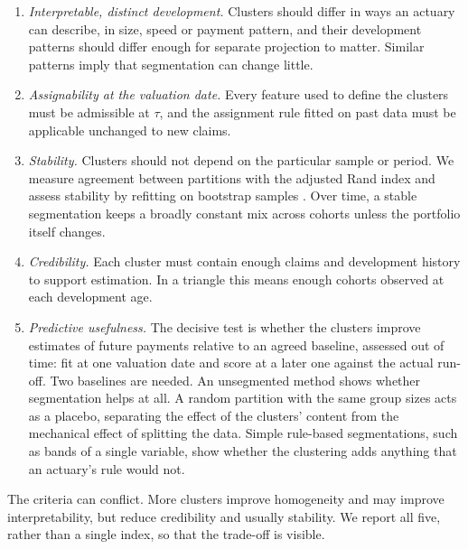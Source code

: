 \begin{enumerate}[leftmargin=*]
\item \emph{Interpretable, distinct development.} Clusters should differ in ways an actuary can describe, in size, speed or payment pattern, and their development patterns should differ enough for separate projection to matter. Similar patterns imply that segmentation can change little.
\item \emph{Assignability at the valuation date.} Every feature used to define the clusters must be admissible at $\tau$, and the assignment rule fitted on past data must be applicable unchanged to new claims.
\item \emph{Stability.} Clusters should not depend on the particular sample or period. We measure agreement between partitions with the adjusted Rand index \parencite{hubert1985comparing} and assess stability by refitting on bootstrap samples \parencite{hennig2007cluster}. Over time, a stable segmentation keeps a broadly constant mix across cohorts unless the portfolio itself changes.
\item \emph{Credibility.} Each cluster must contain enough claims and development history to support estimation. In a triangle this means enough cohorts observed at each development age.
\item \emph{Predictive usefulness.} The decisive test is whether the clusters improve estimates of future payments relative to an agreed baseline, assessed out of time: fit at one valuation date and score at a later one against the actual run-off. Two baselines are needed. An unsegmented method shows whether segmentation helps at all. A random partition with the same group sizes acts as a placebo, separating the effect of the clusters' content from the mechanical effect of splitting the data. Simple rule-based segmentations, such as bands of a single variable, show whether the clustering adds anything that an actuary's rule would not.
\end{enumerate}

The criteria can conflict. More clusters improve homogeneity and may improve interpretability, but reduce credibility and usually stability. We report all five, rather than a single index, so that the trade-off is visible.
